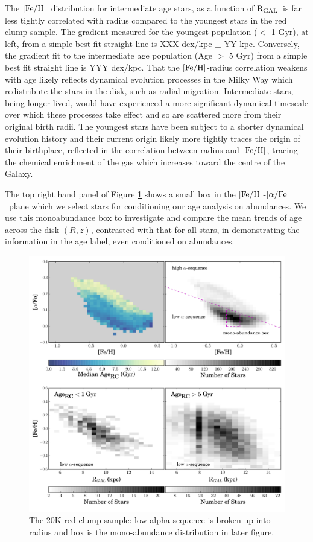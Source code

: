 \documentclass[12pt, preprint]{aastex}
\newcommand{\feh}{\mbox{$\rm [Fe/H]$}}
\newcommand{\alphafe}{\mbox{$\rm [\alpha/Fe]$}}
\newcommand{\rgal}{\mbox{$\rm R_{GAL}$}}
\begin{document}
The \feh\ distribution for intermediate age stars, as a function of \rgal\ is far less tightly correlated with radius compared to the youngest stars in the red clump sample. The gradient measured for the youngest population ($<$ 1 Gyr), at left, from a simple best fit straight line is XXX dex/kpc $\pm$ YY kpc. Conversely, the gradient fit to the intermediate age population (Age $>$ 5 Gyr) from a simple best fit straight line is YYY dex/kpc. That the \feh-radius correlation weakens with age likely reflects dynamical evolution processes in the Milky Way which redistribute the stars in the disk, such as radial migration. Intermediate stars, being longer lived, would have experienced a more significant dynamical timescale over which these processes take effect and so are scattered more from their original birth radii.  The youngest stars have been subject to a shorter dynamical evolution history and their current origin likely more tightly traces the origin of their birthplace, reflected in the correlation between radius and \feh, tracing the chemical enrichment of the gas which increases toward the centre of the Galaxy.  

The top right hand panel of Figure \ref{fig:redclump} shows a small box in the \feh-\alphafe\ plane which we select stars for conditioning our age analysis on abundances. We use this monoabundance box to investigate and compare the mean trends of age across the disk $(R,z)$, contrasted with that for all stars, in demonstrating the information in the age label, even conditioned on abundances. 

\begin{figure}[h!]
\centering
 \includegraphics[scale=0.5]{./plots/redclump_4panel.pdf}
    \caption{The 20K red clump sample: low alpha sequence is broken up into radius and box is the mono-abundance distribution in later figure.}
\label{fig:redclump}
\end{figure}
\end{document}

